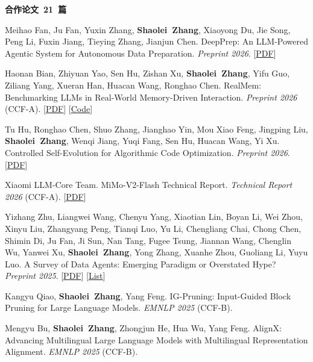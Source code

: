 \documentclass{resume}
\begin{document}
\large\textbf{合作论文\ \textcolor{red1}{21}\ 篇}
\fontsize{9pt}{9.7pt}\selectfont
\begin{enumerate}[label={[\arabic*]},parsep=0ex]

\item Meihao Fan, Ju Fan, Yuxin Zhang, \textbf{Shaolei\ Zhang}, Xiaoyong Du, Jie Song, Peng Li, Fuxin Jiang, Tieying Zhang, Jianjun Chen. DeepPrep: An LLM-Powered Agentic System for Autonomous Data Preparation. \textit{Preprint 2026}. [\href{https://arxiv.org/pdf/2602.07371}{PDF}]


\item Haonan Bian, Zhiyuan Yao, Sen Hu, Zishan Xu, \textbf{Shaolei\ Zhang}, Yifu Guo, Ziliang Yang, Xueran Han, Huacan Wang, Ronghao Chen. RealMem: Benchmarking LLMs in Real-World Memory-Driven Interaction. \textit{Preprint 2026} (\textcolor{red2}{CCF-A}). [\href{https://arxiv.org/pdf/2601.06966}{PDF}] [\href{https://github.com/AvatarMemory/RealMemBench}{Code}]

\item Tu Hu, Ronghao Chen, Shuo Zhang, Jianghao Yin, Mou Xiao Feng, Jingping Liu, \textbf{Shaolei\ Zhang}, Wenqi Jiang, Yuqi Fang, Sen Hu, Huacan Wang, Yi Xu. Controlled Self-Evolution for Algorithmic Code Optimization. \textit{Preprint 2026}. [\href{https://arxiv.org/pdf/2601.07348}{PDF}]

\item Xiaomi LLM-Core Team. MiMo-V2-Flash Technical Report. \textit{Technical Report 2026} (\textcolor{red2}{CCF-A}). [\href{https://arxiv.org/pdf/2601.02780}{PDF}]

\item Yizhang Zhu, Liangwei Wang, Chenyu Yang, Xiaotian Lin, Boyan Li, Wei Zhou, Xinyu Liu, Zhangyang Peng, Tianqi Luo, Yu Li, Chengliang Chai, Chong Chen, Shimin Di, Ju Fan, Ji Sun, Nan Tang, Fugee Tsung, Jiannan Wang, Chenglin Wu, Yanwei Xu, \textbf{Shaolei\ Zhang}, Yong Zhang, Xuanhe Zhou, Guoliang Li, Yuyu Luo. A Survey of Data Agents: Emerging Paradigm or Overstated Hype? \textit{Preprint 2025}. [\href{https://arxiv.org/pdf/2510.23587}{PDF}] [\href{https://github.com/HKUSTDial/awesome-data-agents}{List}]


    \item Kangyu Qiao, \textbf{Shaolei\ Zhang}, Yang Feng. IG-Pruning: Input-Guided Block Pruning for Large Language Models. \textit{EMNLP 2025} (\textcolor{red2}{CCF-B}).
    
    \item Mengyu Bu, \textbf{Shaolei\ Zhang}, Zhongjun He, Hua Wu, Yang Feng. AlignX: Advancing Multilingual Large Language Models with Multilingual Representation Alignment. \textit{EMNLP 2025} (\textcolor{red2}{CCF-B}).
    

\end{enumerate}
\end{document}
